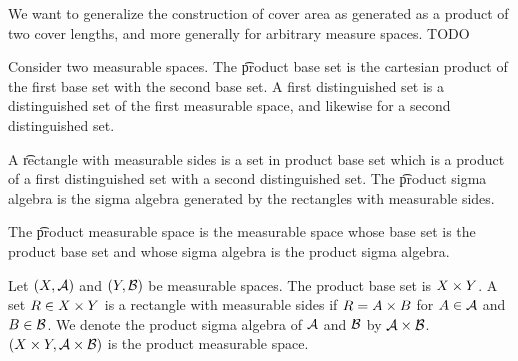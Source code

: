 

We want to generalize the
construction of cover area
as generated as a product
of two cover lengths, and more
generally for arbitrary
measure spaces.
TODO


Consider two measurable spaces.
The \t{product base set} is
the cartesian product of
the first base set with
the second base set.
A first distinguished set
is a distinguished set
of the first measurable space,
and likewise for a second distinguished set.

A \t{rectangle with measurable sides} is a set in product base set which is a product of a first distinguished set with a second distinguished set.
The \t{product sigma algebra} is the sigma algebra generated by the rectangles with measurable sides.

The \t{product measurable space} is the measurable space whose base set is the product base set and whose sigma algebra is the product sigma algebra.


Let $(X, \mathcal{A})$ and $(Y, \mathcal{B})$ be measurable spaces.
The product base set is $X \times Y$.
A set $R \in X \times Y$ is a rectangle with measurable sides if $R = A \times B$ for $A \in \mathcal{A}$ and $B \in \mathcal{B}$.
We denote the product sigma algebra of $\mathcal{A}$ and $\mathcal{B}$ by $\mathcal{A} \times \mathcal{B}$.
$(X \times Y, \mathcal{A} \times \mathcal{B})$ is the product measurable space.

\blankpage
